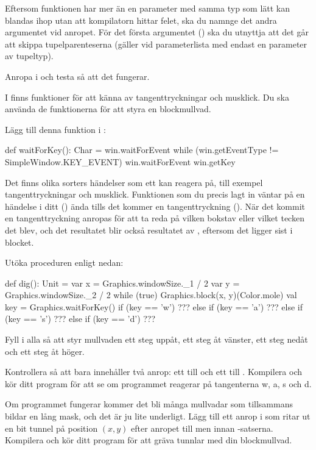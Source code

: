 Eftersom funktionen  har mer än en parameter med samma typ som lätt kan blandas ihop utan att kompilatorn hittar felet, ska du namnge det andra argumentet  vid anropet. För det första argumentet () ska du utnyttja att det går att skippa tupelparenteserna (gäller vid parameterlista med endast en parameter av tupeltyp).

\Subtask Anropa  i  och testa så att det fungerar.

\Task
I  finns funktioner för att känna av tangenttryckningar och musklick.
Du ska använda de funktionerna för att styra en blockmullvad.

\Subtask
Lägg till denna funktion i :
\begin{Code}
  def waitForKey(): Char = {
    win.waitForEvent
    while (win.getEventType != SimpleWindow.KEY_EVENT) win.waitForEvent
    win.getKey
  }
\end{Code}
\noindent Det finns olika sorters händelser som ett  kan reagera på, till exempel tangenttryckningar och musklick.
Funktionen som du precis lagt in väntar på en händelse i ditt  () ända tills det kommer en tangenttryckning ().
När det kommit en tangenttryckning anropas  för att ta reda på vilken bokstav eller vilket tecken det blev, och det resultatet blir också resultatet av , eftersom det ligger sist i blocket.

\Subtask
Utöka proceduren  enligt nedan:
\begin{Code}
  def dig(): Unit = {
    var x = Graphics.windowSize._1 / 2
    var y = Graphics.windowSize._2 / 2
    while (true) {
      Graphics.block(x, y)(Color.mole)
      val key = Graphics.waitForKey()
      if      (key == 'w') ???
      else if (key == 'a') ???
      else if (key == 's') ???
      else if (key == 'd') ???
    }
  }
\end{Code}

\Subtask Fyll i alla  så att  styr mullvaden ett steg uppåt,  ett steg åt vänster,  ett steg nedåt och  ett steg åt höger.

\Subtask Kontrollera så att  bara innehåller två anrop: ett till  och ett till . Kompilera och kör ditt program för att se om programmet reagerar på tangenterna w, a, s och d.

\Subtask Om programmet fungerar kommer det bli många mullvadar som tillsammans bildar en lång mask, och det är ju lite underligt. Lägg till ett anrop i  som ritar ut en bit tunnel på position $(x, y)$ efter anropet till  men innan -satserna. Kompilera och kör ditt program för att gräva tunnlar med din blockmullvad.

